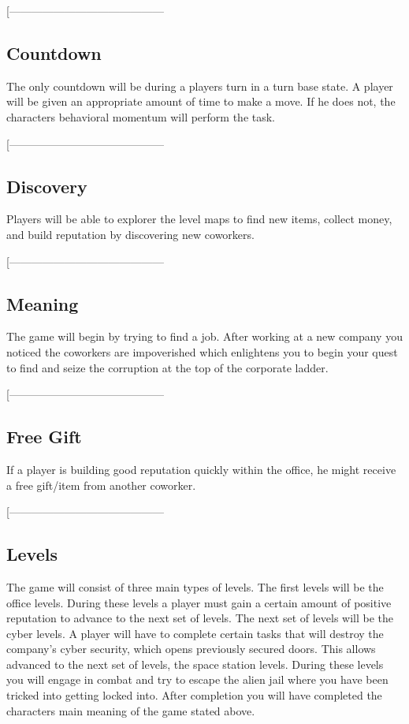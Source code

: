 \documentclass[9pt]{article}
\begin{document}
[------------------------------------------
\smallskip


\subsection*{Countdown}
The only countdown will be during a players turn in a turn base state. A player will be given an appropriate amount of time to make a move. If he does not, the characters behavioral momentum will perform the task.

[------------------------------------------
\smallskip


\subsection*{Discovery}
Players will be able to explorer the level maps to find new items, collect money, and build reputation by discovering new coworkers.

[------------------------------------------
\smallskip


\subsection*{Meaning}
The game will begin by trying to find a job. After working at a new company you noticed the coworkers are impoverished which enlightens you to begin your quest to find and seize the corruption at the top of the corporate ladder.

[------------------------------------------
\smallskip


\subsection*{Free Gift}
If a player is building good reputation quickly within the office, he might receive a free gift/item from another coworker.

[------------------------------------------
\smallskip


\subsection*{Levels}
The game will consist of three main types of levels. The first levels will be the office levels. During these levels a player must gain a certain amount of positive reputation to advance to the next set of levels. The next set of levels will be the cyber levels. A player will have to complete certain tasks that will destroy the company’s cyber security, which opens previously secured doors. This allows advanced to the next set of levels, the space station levels. During these levels you will engage in combat and try to escape the alien jail where you have been tricked into getting locked into. After completion you will have completed the characters main meaning of the game stated above.
\end{document}
